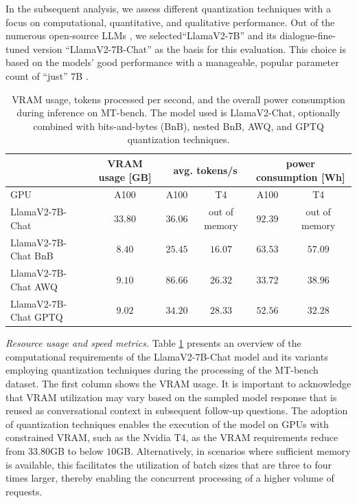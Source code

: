 \documentclass[conference]{IEEEtran}
\begin{document}
In the subsequent analysis, we assess different quantization techniques with a focus on computational, quantitative, and qualitative performance. Out of the numerous open-source LLMs \cite{zhao_survey_2023}, we selected``LlamaV2-7B'' and its dialogue-fine-tuned version ``LlamaV2-7B-Chat'' as the basis for this evaluation. This choice is based on the models' good performance with a manageable, popular parameter count of ``just'' $7$B \cite{touvron_llama_2023}.

\begin{table}
\caption{VRAM usage, tokens processed per second, and the overall power consumption during inference on MT-bench. The model used is LlamaV2-Chat, optionally combined with bits-and-bytes (BnB), nested BnB, AWQ, and GPTQ quantization techniques.}
\label{tab:inference_metrics}
\centering
\begin{tabular}{lccccc}
                & VRAM usage [GB] & \multicolumn{2}{c}{avg. tokens/s} & \multicolumn{2}{c}{power consumption [Wh]}  \\  \hline
GPU                        & A100      & A100  & T4  & A100  & T4 \\ \hline
LlamaV2-7B-Chat            & $33.80$ & $36.06$ & out of memory & $92.39$ & out of memory \\
LlamaV2-7B-Chat BnB        & $8.40$ & $25.45$ & $16.07$ & $63.53$ & $57.09$ \\
LlamaV2-7B-Chat AWQ        & $9.10$ & $86.66$ & $26.32$ & $33.72$ & $38.96$ \\
LlamaV2-7B-Chat GPTQ       & $9.02$ & $34.20$ & $28.33$ & $52.56$ & $32.28$ \\ \hline
\end{tabular}
\end{table}

\emph{Resource usage and speed metrics.}
Table \ref{tab:inference_metrics} presents an overview of the computational requirements of the LlamaV2-7B-Chat model and its variants employing quantization techniques during the processing of the MT-bench dataset. The first column shows the VRAM usage. It is important to acknowledge that VRAM utilization may vary based on the sampled model response that is reused as conversational context in subsequent follow-up questions.
The adoption of quantization techniques enables the execution of the model on GPUs with constrained VRAM, such as the Nvidia T4, as the VRAM requirements reduce from $33.80$GB to below $10$GB. Alternatively, in scenarios where sufficient memory is available, this facilitates the utilization of batch sizes that are three to four times larger, thereby enabling the concurrent processing of a higher volume of requests.
\end{document}

